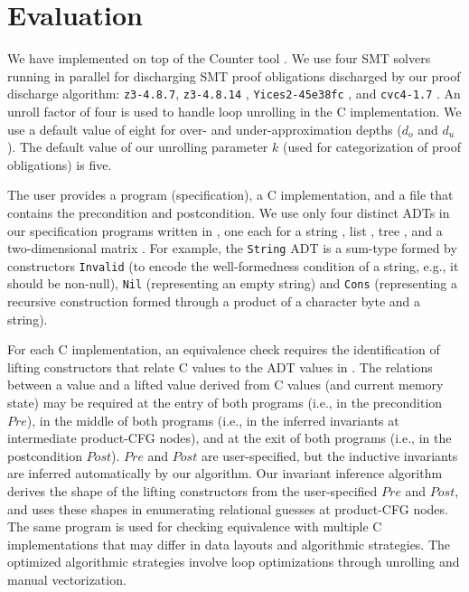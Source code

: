\section{Evaluation}
\label{sec:eval}

We have implemented \toolName{} on top of the
Counter tool \cite{oopsla20}.
We use four SMT solvers running in parallel for discharging
SMT proof obligations discharged by our proof discharge algorithm:
{\tt z3-4.8.7}, {\tt z3-4.8.14} \cite{z3},
{\tt Yices2-45e38fc} \cite{yices},
and {\tt cvc4-1.7} \cite{cvc4solver}.
An unroll factor of four is used to handle loop unrolling in the C implementation.
We use a default value of eight for
over- and under-approximation depths ($d_o$ and $d_u$).
The default value of
our unrolling parameter $k$ (used for categorization of proof obligations) is five.

The user provides a \SpecL{} program (specification), a C implementation,
and a file that contains the precondition and postcondition.
We use only four distinct ADTs in our specification
programs written in \SpecL{}, one each for a string , list ,
tree , and a two-dimensional
matrix .
For example, the {\tt String} ADT is a sum-type formed by constructors
{\tt Invalid} (to
encode the well-formedness condition of a string, e.g., it should be non-null),
{\tt Nil} (representing an empty string) and {\tt Cons} (representing
a recursive construction formed through a product of a character byte and a string).

For each C implementation, an equivalence check requires the identification of
lifting constructors that relate C values to the ADT values in \SpecL{}.
The relations between a \SpecL{} value and a lifted value derived from C values (and current memory state)
may be required at the entry of both programs (i.e., in the precondition $Pre$),
in the middle of both programs (i.e., in the inferred invariants at intermediate product-CFG
nodes), and at the exit of both programs (i.e., in the postcondition $Post$).
$Pre$ and $Post$ are user-specified, but the inductive invariants are inferred
automatically by our algorithm.
 Our invariant inference algorithm derives
the shape of the lifting constructors from the user-specified $Pre$ and $Post$,
and uses these shapes in enumerating relational guesses at product-CFG nodes.
The same \SpecL{} program
is used for checking equivalence with multiple C implementations that may differ
in data layouts and algorithmic strategies.
The optimized algorithmic strategies involve
loop optimizations through unrolling and manual vectorization.

